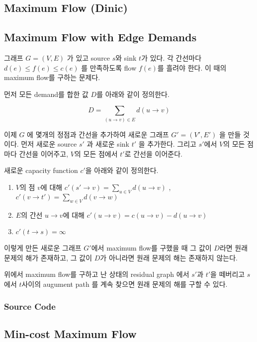 \documentclass[10pt,landscape,a4paper,twocolumn]{article}
\begin{document}
\subsection{Maximum Flow (Dinic)}


\subsection{Maximum Flow with Edge Demands}

그래프 $G=(V,E)$ 가 있고 source $s$와 sink $t$가 있다. 각 간선마다 $d(e) \leq f(e) \leq c(e)$ 를 만족하도록 flow $f(e)$를 흘려야 한다. 이 때의 maximum flow를 구하는 문제다.

먼저 모든 demand를 합한 값 $D$를 아래와 같이 정의한다.

\begin{displaymath}
D = \sum_{(u \to v) \in E} d(u \to v)
\end{displaymath}

이제 $G$ 에 몇개의 정점과 간선을 추가하여 새로운 그래프 $G'=(V',E')$ 을 만들 것이다. 먼저 새로운 source $s'$ 과 새로운 sink $t'$ 을 추가한다. 그리고 $s'$에서 $V$의 모든 점마다 간선을 이어주고, $V$의 모든 점에서 $t'$로 간선을 이어준다.

새로운 capacity function $c'$을 아래와 같이 정의한다.

\begin{enumerate}
\item $V$의 점 $v$에 대해 $c'(s' \to v) = \sum_{u \in V} d(u \to v)$ , $c'(v \to t') = \sum_{w \in V} d(v \to w)$
\item $E$의 간선 $u \to v$에 대해 $c'(u \to v) = c(u \to v) - d(u \to v)$
\item $c'(t \to s) = \infty$
\end{enumerate}

이렇게 만든 새로운 그래프 $G'$에서 maximum flow를 구했을 때 그 값이 $D$라면 원래 문제의 해가 존재하고, 그 값이 $D$가 아니라면 원래 문제의 해는 존재하지 않는다.

위에서 maximum flow를 구하고 난 상태의 residual graph 에서 $s'$과 $t'$을 떼버리고 $s$에서 $t$사이의 augument path 를 계속 찾으면 원래 문제의 해를 구할 수 있다.

\subsubsection{Source Code}


\subsection{Min-cost Maximum Flow}

\end{document}
